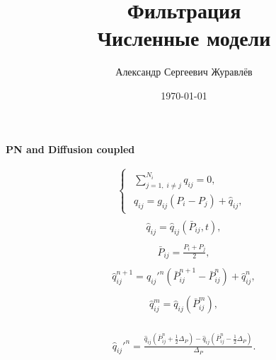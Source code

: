 \documentclass[a4paper,12pt,russian]{extreport}
\author{Александр Сергеевич Журавлёв}
\title{Фильтрация\\Численные модели}
\date{\today}
\begin{document}
\pagecolor{pageColor}
\color{fontColor}
\Russian
\printnomenclature[5em]


\begin{center}
{\large \textbf{PN and Diffusion coupled}}
\end{center}

\begin{eqnarray}
\begin{cases}
\begin{gathered}
\sum^{N_{i}}_{j=1, \; i\neq j} q_{ij} = 0,   \\
q_{ij} = g_{ij} \left(P_{i} - P_{j}\right) + \hat{q}_{ij} ,
\end{gathered}
\end{cases}
\end{eqnarray}
%
\begin{eqnarray}
\begin{gathered}
\hat{q}_{ij} =\hat{q}_{ij} \left(\bar{P}_{ij}, t\right),  
\end{gathered}
\end{eqnarray}
%
\begin{eqnarray}
\begin{gathered}
\bar{P}_{ij} = \frac{P_i+P_j}{2}, 
\end{gathered}
\end{eqnarray}
%
\begin{eqnarray}
\begin{gathered}
\hat{q}_{ij}^{n+1} = \hat{q}_{ij}'^n\left(\bar{P}_{ij}^{n+1}-\bar{P}_{ij}^n\right)+\hat{q}_{ij}^n,
\end{gathered}
\end{eqnarray}
%
\begin{eqnarray}
\begin{gathered}
\hat{q}_{ij}^{m} = \hat{q}_{ij}\left(\bar{P}_{ij}^m\right),
\end{gathered}
\end{eqnarray}



\begin{eqnarray}
\begin{gathered}
\hat{q}_{ij}'^n = \frac{\hat{q}_{ij}\left(\bar{P}_{ij}^n+ \frac{1}{2}\Delta_P\right)-
\hat{q}_{ij}\left(\bar{P}_{ij}^n-\frac{1}{2}\Delta_P\right)}{{\Delta_P}}.
\end{gathered}
\end{eqnarray}
%
\end{document}

